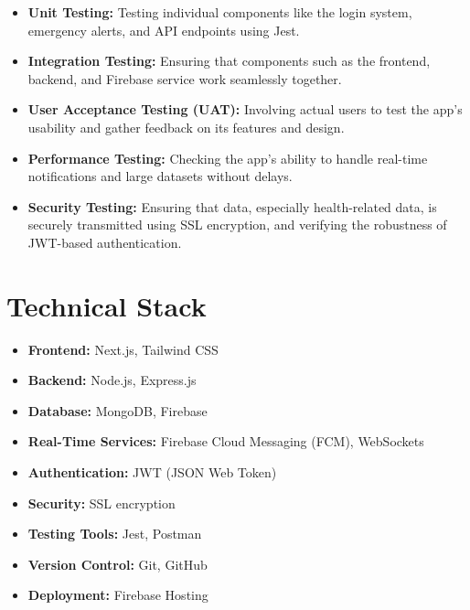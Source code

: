 \documentclass[a4paper, 12pt]{article}
\begin{document}
\begin{itemize}
    \item \textbf{Unit Testing:} Testing individual components like the login system, emergency alerts, and API endpoints using Jest.
    \item \textbf{Integration Testing:} Ensuring that components such as the frontend, backend, and Firebase service work seamlessly together.
    \item \textbf{User Acceptance Testing (UAT):} Involving actual users to test the app’s usability and gather feedback on its features and design.
    \item \textbf{Performance Testing:} Checking the app's ability to handle real-time notifications and large datasets without delays.
    \item \textbf{Security Testing:} Ensuring that data, especially health-related data, is securely transmitted using SSL encryption, and verifying the robustness of JWT-based authentication.
\end{itemize}

\section{\textbf{\LARGE Technical Stack}}

\begin{itemize}
    \item \textbf{Frontend:} Next.js, Tailwind CSS
    \item \textbf{Backend:} Node.js, Express.js
    \item \textbf{Database:} MongoDB, Firebase
    \item \textbf{Real-Time Services:} Firebase Cloud Messaging (FCM), WebSockets
    \item \textbf{Authentication:} JWT (JSON Web Token)
    \item \textbf{Security:} SSL encryption
    \item \textbf{Testing Tools:} Jest, Postman
    \item \textbf{Version Control:} Git, GitHub
    \item \textbf{Deployment:} Firebase Hosting
\end{itemize}
\end{document}
